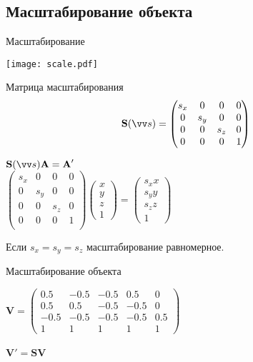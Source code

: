 \documentclass[10pt]{beamer}
\begin{document}
	\subsection{Масштабирование объекта}
	
	
	\begin{frame}{Масштабирование}
		
		{
			\texttt{[image: scale.pdf]}
		}
		{
			\begin{block}{Матрица масштабирования}
				$$
				\textbf{S}(\vv s) =
				\begin{pmatrix}
					s_x & 0 & 0 & 0\\
					0 & s_y & 0 & 0\\
					0 & 0 & s_z & 0\\
					0 & 0 & 0 & 1\\
				\end{pmatrix}
				$$
			\end{block}
			
			$\textbf{S}(\vv s)\textbf{A}=\textbf{A}'$ \\[0.5em]
			$
			\begin{pmatrix}
				s_x & 0 & 0 & 0\\
				0 & s_y & 0 & 0\\
				0 & 0 & s_z & 0\\
				0 & 0 & 0 & 1\\
			\end{pmatrix}
			\begin{pmatrix}
				x\\
				y\\
				z\\
				1
			\end{pmatrix}
			=
			\begin{pmatrix}
				s_xx\\
				s_yy\\
				s_zz\\
				1
			\end{pmatrix}			
			$
			
		Если $s_x=s_y=s_z$ масштабирование равномерное.
		}
		
	\end{frame}
	

	\begin{frame}{Масштабирование объекта}
		{
		}
		{
			$\mathbf V = 
			\begin{pmatrix}
				0.5 & -0.5 &-0.5& 0.5& 0\\
				0.5 & 0.5& -0.5& -0.5 & 0\\
				-0.5& -0.5& -0.5 &-0.5& 0.5\\
				1& 1& 1& 1& 1
			\end{pmatrix}$ \\ ~ \\
			
			$\mathbf V' = \mathbf{SV}$
			
			
		}
	\end{frame}
\end{document}
